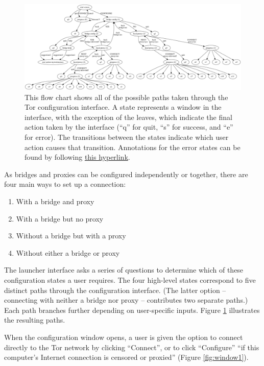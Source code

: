\documentclass{template}
\begin{document}
\begin{figure}[t]
  \centering
    \includegraphics[width=\textwidth]{../torconfig.png}
    \caption{This flow chart shows all of the possible paths taken through the
    Tor configuration interface. A state represents a window in the interface,
    with the exception of the leaves, which indicate the final action taken by
    the interface (``q'' for quit, ``s'' for success, and ``e'' for error). The
    transitions between the states indicate which user action causes that
    transition. Annotations for the error states can be found by following
\href{https://github.com/lindanlee/circumvention-ux-tor/blob/master/torconfig.dot}{this hyperlink}.}
\label{fig:interface}
\end{figure}

As bridges and proxies can be configured independently or together, there are
four main ways to set up a connection:

\begin{enumerate} \itemsep1pt \parskip0pt 
    \item With a bridge and proxy
    \item With a bridge but no proxy
    \item Without a bridge but with a proxy
    \item Without either a bridge or proxy
\end{enumerate}

The launcher interface asks a series of questions to
determine which of these configuration states a user requires.
The four high-level states correspond to five distinct paths through the
configuration interface. (The latter option -- connecting with neither a bridge
nor proxy -- contributes two separate paths.) Each path branches further
depending on user-specific inputs. Figure \ref{fig:interface} illustrates the
resulting paths. 

When the configuration window opens, a user is given the option to connect
directly to the Tor network by clicking ``Connect'', or to click ``Configure''
``if this computer's Internet connection is censored or proxied'' (Figure
\ref{fig:window1}).
\end{document}
